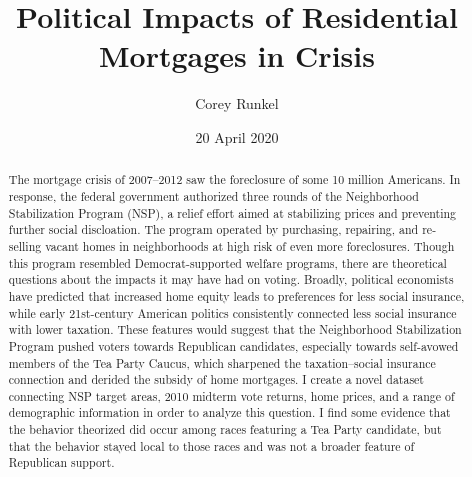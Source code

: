 \documentclass[12pt,oneside]{psthesis}
\title{Political Impacts of Residential Mortgages in Crisis}
\author{Corey Runkel}
\date{20 April 2020}
\begin{document}
  \maketitle

\frontmatter %

  \setcounter{tocdepth}{2}
  \tableofcontents
  \thispagestyle{plain}

  \listoftables
  \thispagestyle{plain}

  \printnomenclature
  \thispagestyle{plain}

  \listoffigures
  \thispagestyle{plain}
  \begin{abstract}
  \thispagestyle{plain}
    The mortgage crisis of 2007--2012 saw the foreclosure of some 10 million Americans.
    In response, the federal government authorized three rounds of the Neighborhood Stabilization Program (NSP), a relief effort aimed at stabilizing prices and preventing further social discloation.
    The program operated by purchasing, repairing, and re-selling vacant homes in neighborhoods at high risk of even more foreclosures.
    Though this program resembled Democrat-supported welfare programs, there are theoretical questions about the impacts it may have had on voting.
    Broadly, political economists have predicted that increased home equity leads to preferences for less social insurance, while early 21st-century American politics consistently connected less social insurance with lower taxation.
    These features would suggest that the Neighborhood Stabilization Program pushed voters towards Republican candidates, especially towards self-avowed members of the Tea Party Caucus, which sharpened the taxation--social insurance connection and derided the subsidy of home mortgages.
    I create a novel dataset connecting NSP target areas, 2010 midterm vote returns, home prices, and a range of demographic information in order to analyze this question.
    I find some evidence that the behavior theorized did occur among races featuring a Tea Party candidate, but that the behavior stayed local to those races and was not a broader feature of Republican support.
  \end{abstract}
\end{document}
